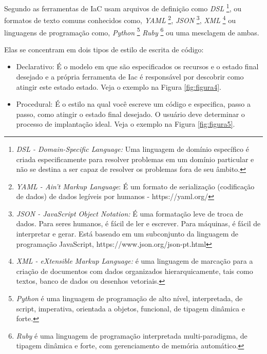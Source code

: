 Segundo  as ferramentas de IaC usam arquivos de definição como \textit{DSL} \footnote{\textit{DSL - Domain-Specific Language:} Uma linguagem de domínio específico é criada especificamente para resolver problemas em um domínio particular e não se destina a ser capaz de resolver os problemas fora de seu âmbito. }, ou formatos de texto comuns conhecidos como, \textit{ YAML} \footnote{\textit{YAML - Ain't  Markup Language}: É um formato de serialização (codificação de dados) de dados legíveis por humanos -  https://yaml.org/ }, \textit{JSON} \footnote{\textit{JSON - JavaScript Object Notation:} É uma formatação leve de troca de dados. Para seres humanos, é fácil de ler e escrever. Para máquinas, é fácil de interpretar e gerar. Está baseado em um subconjunto da linguagem de programação JavaScript, https://www.json.org/json-pt.html}, \textit{XML} \footnote{\textit{XML - eXtensible Markup Language:} é uma linguagem de marcação para a criação de documentos com dados organizados hierarquicamente, tais como textos, banco de dados ou desenhos vetoriais.}
  ou linguagens de programação como, \textit{Python} \footnote{\textit{Python} é uma linguagem de programação de alto nível, interpretada, de script, imperativa, orientada a objetos, funcional, de tipagem dinâmica e forte.}  \textit{Ruby} \footnote{\textit{Ruby} é uma linguagem de programação interpretada multi-paradigma, de tipagem dinâmica e forte, com gerenciamento de memória automático.}  ou uma mesclagem de ambas.
  
  Elas se concentram em dois tipos de estilo de escrita de código: 
   \begin{itemize}
       \item Declarativo: É o modelo em que são especificados os  recursos e o estado final desejado e a própria ferramenta de Iac é responsável por descobrir como atingir este  estado estado. Veja o exemplo na Figura \ref{fig:figura4}.
   \end{itemize}

 \begin{itemize}
    \item Procedural: É o estilo na qual você escreve um código e especifica, passo a passo, como atingir o estado final desejado. O usuário deve determinar o processo de implantação ideal. Veja o exemplo na Figura \ref{fig:figura5}.
   \end{itemize}
   
